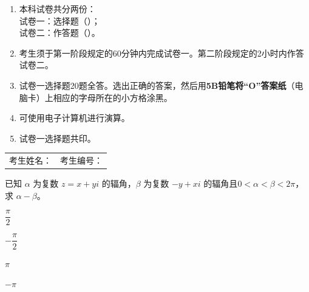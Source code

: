\documentclass[12pt,a4paper]{exam-zh}
\begin{document}
    \begin{enumerate}[label=\arabic*、,leftmargin=2em,itemsep=0.65em]
    \item 本科试卷共分两份：\\
    试卷一：选择题（\paperonepercentage）；\\
    试卷二：作答题（\papertwopercentage）。

    \item 考生须于第一阶段规定的60分钟内完成试卷一。第二阶段规定的2小时内作答试卷二。

    \item 试卷一选择题20题全答。选出正确的答案，然后用\textbf{5B铅笔将“O”答案纸}（电脑卡）上相应的字母所在的小方格涂黑。

    \item 可使用电子计算机进行演算。

    \item 试卷一选择题共印\questionpages。
    \end{enumerate}

    \vspace{2.0em}

    \begin{center}
    {\setlength{\fboxrule}{1.2pt}}
    \end{center}

    \vfill

    \begin{tabular*}{\linewidth}{@{\extracolsep{\fill}}ll}
    考生姓名：\underline{\hspace{4.2cm}} & 考生编号：\underline{\hspace{4.0cm}}
    \end{tabular*}


\newpage



\begin{question}
    已知 $\alpha$ 为复数 $z=x+yi$ 的辐角，$\beta$ 为复数 $-y+xi$ 的辐角且$0 < \alpha < \beta < 2\pi$，求 $\alpha-\beta$。 \paren[2]
    \begin{choices}
        \item $\dfrac{\pi}{2}$
        \item $-\dfrac{\pi}{2}$
        \item $\pi$
        \item $-\pi$
    \end{choices}
\end{question}
\end{document}
